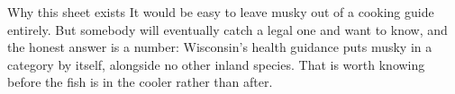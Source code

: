\begin{telospanel}{Why this sheet exists}
It would be easy to leave musky out of a cooking guide entirely. But somebody will eventually catch a legal one and want to know, and the honest answer is a number: Wisconsin's health guidance puts musky in a category by itself, alongside no other inland species. That is worth knowing before the fish is in the cooler rather than after.
\end{telospanel}

\advisorymusky

